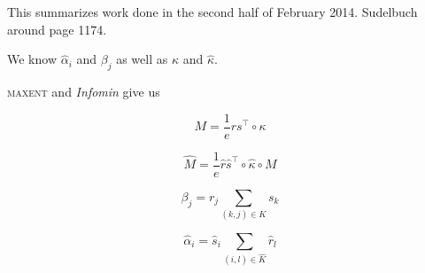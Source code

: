 \documentclass[11pt]{article}
\begin{document}
This summarizes work done in the second half of February 2014.
Sudelbuch around page 1174. 

We know $\hat{\alpha}_{i}$ and $\beta_{j}$ as well as $\kappa$ and
$\hat{\kappa}$.

\textsc{maxent} and \emph{Infomin} give us

\begin{equation}
  \label{eq:m1}
  M=\frac{1}{e}rs^{\intercal}\circ\kappa
\end{equation}

\begin{equation}
  \label{eq:m2}
  \hat{M}=\frac{1}{e}\hat{r}\hat{s}^{\intercal}\circ\hat{\kappa}\circ{}M
\end{equation}

\begin{equation}
  \label{eq:m3}
  \beta_{j}=r_{j}\sum_{(k,j)\in{}K}s_{k}
\end{equation}

\begin{equation}
  \label{eq:m4}
  \hat{\alpha}_{i}=\hat{s}_{i}\sum_{(i,l)\in\hat{K}}\hat{r}_{l}
\end{equation}
\end{document}
